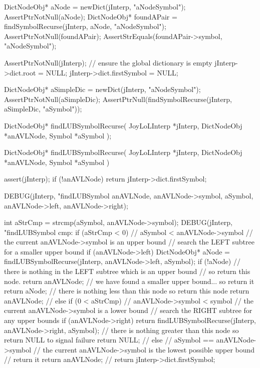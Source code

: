   DictNodeObj* aNode = newDict(jInterp, "aNodeSymbol");
  AssertPtrNotNull(aNode);
  DictNodeObj* foundAPair = findSymbolRecurse(jInterp, aNode, "aNodeSymbol");
  AssertPtrNotNull(foundAPair);
  AssertStrEquals(foundAPair->symbol, "aNodeSymbol");
\stopCTest
\stopTestCase

\startCTest
  AssertPtrNotNull(jInterp);
  // ensure the global dictionary is empty
  jInterp->dict.root        = NULL;
  jInterp->dict.firstSymbol = NULL;

  DictNodeObj* aSimpleDic = newDict(jInterp, "aNodeSymbol");
  AssertPtrNotNull(aSimpleDic);
  AssertPtrNull(findSymbolRecurse(jInterp, aSimpleDic, "aSymbol"));
\stopCTest
\stopTestCase
\stopTestSuite

\startCHeader
DictNodeObj* findLUBSymbolRecurse(
  JoyLoLInterp *jInterp,
  DictNodeObj      *anAVLNode,
  Symbol       *aSymbol
);
\stopCHeader
{}

\startCCode
DictNodeObj* findLUBSymbolRecurse(
  JoyLoLInterp *jInterp,
  DictNodeObj      *anAVLNode,
  Symbol       *aSymbol
) {
  assert(jInterp);
  if (!anAVLNode) return jInterp->dict.firstSymbol;

  DEBUG(jInterp, "findLUBSymbol %
        anAVLNode, anAVLNode->symbol, aSymbol,
        anAVLNode->left, anAVLNode->right);

  int aStrCmp = strcmp(aSymbol, anAVLNode->symbol);
  DEBUG(jInterp, "findLUBSymbol cmp: %
  if (aStrCmp < 0) {
    // aSymbol < anAVLNode->symbol
    // the current anAVLNode->symbol is an upper bound
    // search the LEFT subtree for a smaller upper bound
    if (anAVLNode->left) {
      DictNodeObj* aNode = findLUBSymbolRecurse(jInterp, anAVLNode->left, aSymbol);
      if (!aNode) {
        // there is nothing in the LEFT subtree which is an upper bound
        // so return this node.
        return anAVLNode;
      }
      // we have found a smaller upper bound... so return it
      return aNode;
    }
    // there is nothing less than this node so return this node
    return anAVLNode;
    //
  } else if (0 < aStrCmp) {
    // anAVLNode->symbol < symbol
    // the current anAVLNode->symbol is a lower bound
    // search the RIGHT subtree for any upper bounds
    if (anAVLNode->right) {
      return findLUBSymbolRecurse(jInterp, anAVLNode->right, aSymbol);
    }
    // there is nothing greater than this node so return NULL to signal failure
    return NULL;
    //
  } else {
    // aSymbol == anAVLNode->symbol
    // the current anAVLNode->symbol is the lowest possible upper bound
    // return it
    return anAVLNode;
    //
  }
  return jInterp->dict.firstSymbol;
}
\stopCCode

